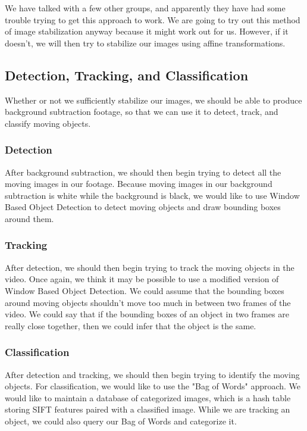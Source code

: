 \documentclass[a4paper, 10pt, conference]{ieeeconf}      %
\begin{document}
We have talked with a few other groups, and apparently they have had some trouble trying to get this approach to work. We are going to try out this method of image stabilization anyway because it might work out for us. However, if it doesn't, we will then try to stabilize our images using affine transformations.

\subsection{Detection, Tracking, and Classification}
Whether or not we sufficiently stabilize our images, we should be able to produce background subtraction footage, so that we can use it to detect, track, and classify moving objects. 

\subsubsection{Detection}
After background subtraction, we should then begin trying to detect all the moving images in our footage. Because moving images in our background subtraction is white while the background is black, we would like to use Window Based Object Detection to detect moving objects and draw bounding boxes around them.
 
\subsubsection{Tracking}
After detection, we should then begin trying to track the moving objects in the video. Once again, we think it may be possible to use a modified version of Window Based Object Detection. We could assume that the bounding boxes around moving objects shouldn't move too much in between two frames of the video. We could say that if the bounding boxes of an object in two frames are really close together, then we could infer that the object is the same. 

\subsubsection{Classification}
After detection and tracking, we should then begin trying to identify the moving objects. For classification, we would like to use the "Bag of Words" approach. We would like to maintain a database of categorized images, which is a hash table storing SIFT features paired with a classified image. While we are tracking an object, we could also query our Bag of Words and categorize it.
\end{document}
